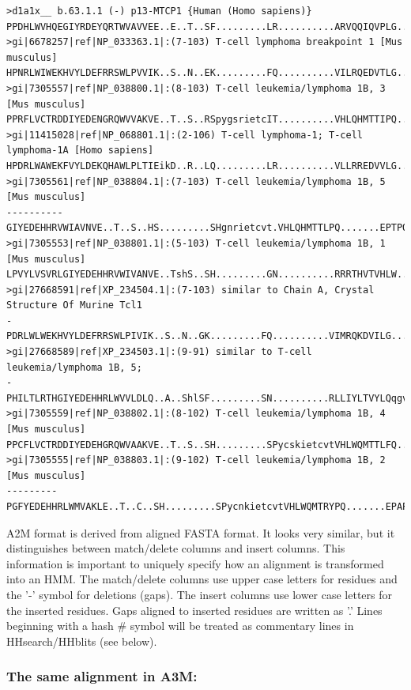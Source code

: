 \documentclass[11pt,a4paper]{article}
\begin{document}
\scriptsize
\begin{verbatim}
>d1a1x__ b.63.1.1 (-) p13-MTCP1 {Human (Homo sapiens)}
PPDHLWVHQEGIYRDEYQRTWVAVVEE..E..T..SF.........LR..........ARVQQIQVPLG.......DAARPSHLLTS.....QL
>gi|6678257|ref|NP_033363.1|:(7-103) T-cell lymphoma breakpoint 1 [Mus musculus]
HPNRLWIWEKHVYLDEFRRSWLPVVIK..S..N..EK.........FQ..........VILRQEDVTLG.......EAMSPSQLVPY.....EL
>gi|7305557|ref|NP_038800.1|:(8-103) T-cell leukemia/lymphoma 1B, 3 [Mus musculus]
PPRFLVCTRDDIYEDENGRQWVVAKVE..T..S..RSpygsrietcIT..........VHLQHMTTIPQ.......EPTPQQPINNN.....SL
>gi|11415028|ref|NP_068801.1|:(2-106) T-cell lymphoma-1; T-cell lymphoma-1A [Homo sapiens]
HPDRLWAWEKFVYLDEKQHAWLPLTIEikD..R..LQ.........LR..........VLLRREDVVLG.......RPMTPTQIGPS.....LL
>gi|7305561|ref|NP_038804.1|:(7-103) T-cell leukemia/lymphoma 1B, 5 [Mus musculus]
----------GIYEDEHHRVWIAVNVE..T..S..HS.........SHgnrietcvt.VHLQHMTTLPQ.......EPTPQQPINNN.....SL
>gi|7305553|ref|NP_038801.1|:(5-103) T-cell leukemia/lymphoma 1B, 1 [Mus musculus]
LPVYLVSVRLGIYEDEHHRVWIVANVE..TshS..SH.........GN..........RRRTHVTVHLW.......KLIPQQVIPFNplnydFL
>gi|27668591|ref|XP_234504.1|:(7-103) similar to Chain A, Crystal Structure Of Murine Tcl1
-PDRLWLWEKHVYLDEFRRSWLPIVIK..S..N..GK.........FQ..........VIMRQKDVILG.......DSMTPSQLVPY.....EL
>gi|27668589|ref|XP_234503.1|:(9-91) similar to T-cell leukemia/lymphoma 1B, 5;
-PHILTLRTHGIYEDEHHRLWVVLDLQ..A..ShlSF.........SN..........RLLIYLTVYLQqgvafplESTPPSPMNLN.....GL
>gi|7305559|ref|NP_038802.1|:(8-102) T-cell leukemia/lymphoma 1B, 4 [Mus musculus] 
PPCFLVCTRDDIYEDEHGRQWVAAKVE..T..S..SH.........SPycskietcvtVHLWQMTTLFQ.......EPSPDSLKTFN.....FL
>gi|7305555|ref|NP_038803.1|:(9-102) T-cell leukemia/lymphoma 1B, 2 [Mus musculus]
---------PGFYEDEHHRLWMVAKLE..T..C..SH.........SPycnkietcvtVHLWQMTRYPQ.......EPAPYNPMNYN.....FL
\end{verbatim}\normalsize

A2M format is derived from aligned FASTA format. It looks very similar, but it 
distinguishes between match/delete columns and insert columns. This information is 
important to uniquely specify how an alignment is transformed into an HMM. The 
match/delete columns use upper case letters for residues and the '-' symbol for 
deletions (gaps). The insert columns use lower case letters for the inserted residues. 
Gaps aligned to inserted residues are written as '.' Lines beginning with a hash \# 
symbol will be treated as commentary lines in HHsearch/HHblits (see below).


\subsubsection*{The same alignment in A3M:}
\end{document}
